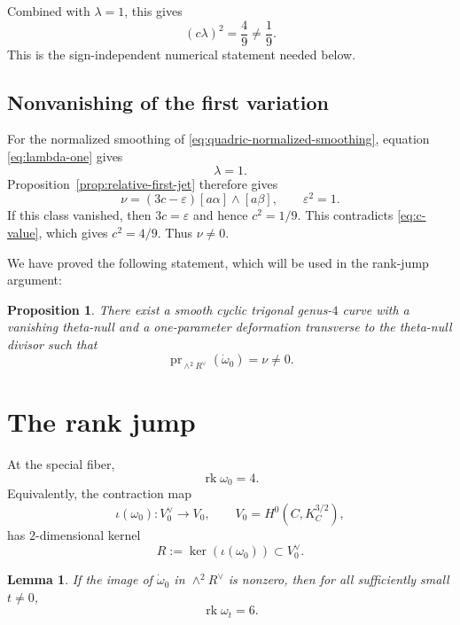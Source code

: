 \documentclass[10pt,a4paper]{amsart}
\newtheorem{proposition}[theorem]{Proposition}
\newtheorem{lemma}[theorem]{Lemma}
\newcommand{\rk}{\operatorname{rk}}
\begin{document}
Combined with $\lambda=1$, this gives
\begin{equation}
\label{eq:clambda-value}
{(c\lambda)^2=\frac49\neq\frac19.}
\end{equation}
This is the sign-independent numerical statement needed below.



\subsection{Nonvanishing of the first variation}
\label{subsec:first-variation-nonzero}

For the normalized smoothing of
\eqref{eq:quadric-normalized-smoothing}, equation
\eqref{eq:lambda-one} gives
\[
{\lambda=1.}
\]
Proposition~\ref{prop:relative-first-jet} therefore gives
\begin{equation}
\label{eq:final-first-variation-coefficient}
\nu
=
{(3c-\varepsilon)}
[a\alpha]\wedge[a\beta],
\qquad
\varepsilon^2=1.
\end{equation}
If this class vanished, then {$3c=\varepsilon$ and hence $c^2=1/9$.}  This contradicts \eqref{eq:c-value}, which gives
$c^2=4/9$.  Thus $\nu\neq0$.

We have proved the following statement, which will be used in the rank-jump
argument:
\begin{proposition}
\label{prop:cyclic-first-variation}
There exist a smooth cyclic trigonal genus-$4$ curve with a vanishing
theta-null and a one-parameter deformation transverse to the
theta-null divisor such that
\[
\operatorname{pr}_{\wedge^2R^\vee}(\dot\omega_0)=\nu\neq0.
\]
\end{proposition}


\section{The rank jump}

At the special fiber,
\[
\rk \omega_0=4.
\]
Equivalently, the contraction map
\[
\iota(\omega_0):V_0^\vee \to V_0,
\qquad V_0=H^0(C,K_C^{3/2}),
\]
has $2$-dimensional kernel
\[
R:=\ker(\iota(\omega_0))\subset V_0^\vee.
\]

\begin{lemma}\label{lem:rankjump}
If the image of \(\dot\omega_0\) in \(\wedge^2 R^\vee\) is nonzero, then for all sufficiently small \(t\neq 0\),
\[
\rk \omega_t=6.
\]
\end{lemma}
\end{document}
